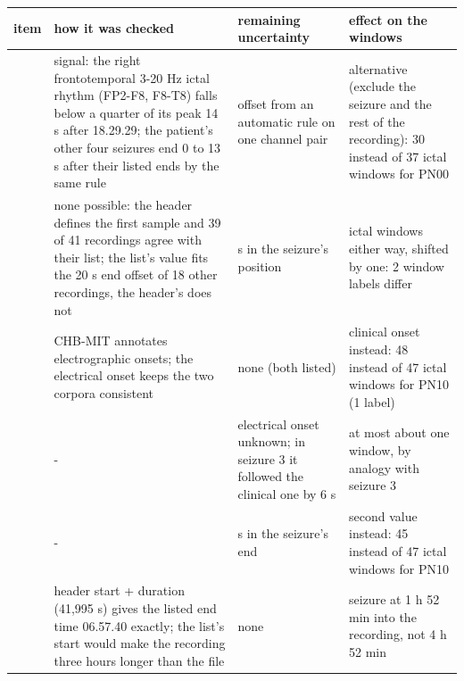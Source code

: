 \documentclass[11pt,a4paper]{article}
\newcounter{none} %
\begin{document}
{\def\LTcaptype{none} %
\begin{longtable}[]{@{}
  >{\raggedright\arraybackslash}p{}
  >{\raggedright\arraybackslash}p{}
  >{\raggedright\arraybackslash}p{}
  >{\raggedright\arraybackslash}p{}@{}}
\toprule\noalign{}
\begin{minipage}[b]{\linewidth}\raggedright
item
\end{minipage} & \begin{minipage}[b]{\linewidth}\raggedright
how it was checked
\end{minipage} & \begin{minipage}[b]{\linewidth}\raggedright
remaining uncertainty
\end{minipage} & \begin{minipage}[b]{\linewidth}\raggedright
effect on the windows
\end{minipage} \\
\midrule\noalign{}
\endhead
\bottomrule\noalign{}
\endlastfoot
1 & signal: the right frontotemporal 3-20 Hz ictal rhythm (FP2-F8, F8-T8) falls below a quarter of its peak 14 s after 18.29.29; the patient's other four seizures end 0 to 13 s after their listed ends by the same rule & offset from an automatic rule on one channel pair & alternative (exclude the seizure and the rest of the recording): 30 instead of 37 ictal windows for PN00 \\
2 & none possible: the header defines the first sample and 39 of 41 recordings agree with their list; the list's value fits the 20 s end offset of 18 other recordings, the header's does not & 10 s in the seizure's position & 4 ictal windows either way, shifted by one: 2 window labels differ \\
3 & CHB-MIT annotates electrographic onsets; the electrical onset keeps the two corpora consistent & none (both listed) & clinical onset instead: 48 instead of 47 ictal windows for PN10 (1 label) \\
4 & - & electrical onset unknown; in seizure 3 it followed the clinical one by 6 s & at most about one window, by analogy with seizure 3 \\
5 & - & 21 s in the seizure's end & second value instead: 45 instead of 47 ictal windows for PN10 \\
6 & header start + duration (41,995 s) gives the listed end time 06.57.40 exactly; the list's start would make the recording three hours longer than the file & none & seizure at 1 h 52 min into the recording, not 4 h 52 min \\
\end{longtable}
}
\end{document}
